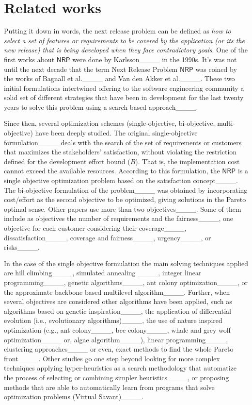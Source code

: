 \section{Related works}
\label{sec:related-work}

Putting it down in words, the next release problem can be defined as \emph{how to select a set of features or requirements to be covered by the application (or its the new release) that is being developed when they face contradictory goals}. One of the first works about \ensuremath{\mathsf{NRP}} were done by Karlsson____ in the 1990s. It's was not until the next decade that the term Next Release Problem \ensuremath{\mathsf{NRP}} was coined by the works of Bagnall et al.____ and Van den Akker et al.____. These two initial formulations intertwined offering to the software engineering community a solid set of different strategies that have been in development for the last twenty years to solve this problem  using a search based approach____.

Since then,  several optimization schemes (single-objective, bi-objective, multi-objective) have been deeply studied. The original single-objective formulation____ deals with the search of the set of requirements or customers that maximizes the stakeholders' satisfaction, without violating the restriction defined for the development effort bound ($B$). That is, the implementation cost cannot exceed the available resources. According to this formulation, the \ensuremath{\mathsf{NRP}} is a single objective optimization problem based on the satisfaction concept____. The bi-objective formulation of the problem____ was obtained by incorporating cost/effort as the second objective to be optimized, giving solutions in the Pareto optimal sense. Other papers use more than two objectives____. Some of them include as objectives the number of requirements and the fairness____, one objective for each customer considering their coverage____, dissatisfaction____, coverage and fairness____, urgency____, or risks____.

In the case of the single objective formulation the main solving techniques applied are  hill climbing____, simulated annealing ____, integer linear programming____, genetic algorithms____, ant colony optimization____, or the approximate backbone based multilevel algorithm____. Further, when several objectives are considered other algorithms have been applied, such as  algorithms based on genetic inspiration____, the application of differential evolution (i.e., evolutionary algorithms)____, the use of nature inspired optimization  (e.g., ant colony____, bee colony____, whale and grey wolf optimization____ or, algae algorithm____),  linear programming____, clustering approaches____ or even,  exact methods to find the whole Pareto front____. Other studies go one step beyond  looking for more complex techniques applying hyper-heuristics as a search methodology that  automatize the process of selecting or combining simpler heuristics____, or proposing methods that are able to automatically learn from programs that solve optimization problems (Virtual Savant)____.
 
